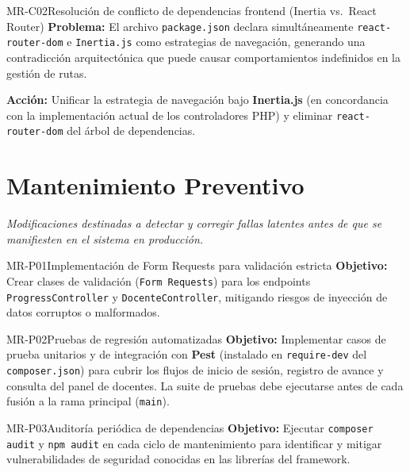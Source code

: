 \begin{RequisitoFuncional}{MR-C02}{Resolución de conflicto de dependencias frontend (Inertia vs.\ React Router)}
    \textbf{Problema:} El archivo \texttt{package.json} declara simultáneamente
    \texttt{react-router-dom} e \texttt{Inertia.js} como estrategias de navegación,
    generando una contradicción arquitectónica que puede causar comportamientos
    indefinidos en la gestión de rutas.

    \textbf{Acción:} Unificar la estrategia de navegación bajo \textbf{Inertia.js}
    (en concordancia con la implementación actual de los controladores PHP) y eliminar
    \texttt{react-router-dom} del árbol de dependencias.
\end{RequisitoFuncional}

\newpage
\section{Mantenimiento Preventivo}

\textit{Modificaciones destinadas a detectar y corregir fallas latentes antes de que
se manifiesten en el sistema en producción.}

\begin{RequisitoFuncional}{MR-P01}{Implementación de Form Requests para validación estricta}
    \textbf{Objetivo:} Crear clases de validación (\texttt{Form Requests}) para los
    endpoints \texttt{ProgressController} y \texttt{DocenteController}, mitigando
    riesgos de inyección de datos corruptos o malformados.
\end{RequisitoFuncional}

\begin{RequisitoFuncional}{MR-P02}{Pruebas de regresión automatizadas}
    \textbf{Objetivo:} Implementar casos de prueba unitarios y de integración con
    \textbf{Pest} (instalado en \texttt{require-dev} del \texttt{composer.json}) para
    cubrir los flujos de inicio de sesión, registro de avance y consulta del panel de
    docentes. La suite de pruebas debe ejecutarse antes de cada fusión a la rama
    principal (\texttt{main}).
\end{RequisitoFuncional}

\begin{RequisitoFuncional}{MR-P03}{Auditoría periódica de dependencias}
    \textbf{Objetivo:} Ejecutar \texttt{composer audit} y \texttt{npm audit} en cada
    ciclo de mantenimiento para identificar y mitigar vulnerabilidades de seguridad
    conocidas en las librerías del framework.
\end{RequisitoFuncional}

